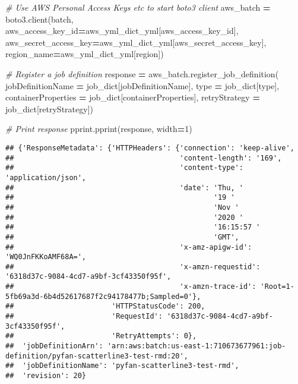 \documentclass[
]{book}
\newenvironment{Shaded}{\begin{snugshade}}{\end{snugshade}}
\newcommand{\BuiltInTok}[1]{#1}
\newcommand{\CommentTok}[1]{\textcolor[rgb]{0.56,0.35,0.01}{\textit{#1}}}
\newcommand{\DecValTok}[1]{\textcolor[rgb]{0.00,0.00,0.81}{#1}}
\newcommand{\NormalTok}[1]{#1}
\newcommand{\OperatorTok}[1]{\textcolor[rgb]{0.81,0.36,0.00}{\textbf{#1}}}
\newcommand{\StringTok}[1]{\textcolor[rgb]{0.31,0.60,0.02}{#1}}
\begin{document}
\begin{Shaded}
\begin{Highlighting}[]
\CommentTok{\# Use AWS Personal Access Keys etc to start boto3 client}
\NormalTok{aws\_batch }\OperatorTok{=}\NormalTok{ boto3.client(}\StringTok{\textquotesingle{}batch\textquotesingle{}}\NormalTok{,}
\NormalTok{  aws\_access\_key\_id}\OperatorTok{=}\NormalTok{aws\_yml\_dict\_yml[}\StringTok{\textquotesingle{}aws\_access\_key\_id\textquotesingle{}}\NormalTok{],}
\NormalTok{  aws\_secret\_access\_key}\OperatorTok{=}\NormalTok{aws\_yml\_dict\_yml[}\StringTok{\textquotesingle{}aws\_secret\_access\_key\textquotesingle{}}\NormalTok{],}
\NormalTok{  region\_name}\OperatorTok{=}\NormalTok{aws\_yml\_dict\_yml[}\StringTok{\textquotesingle{}region\textquotesingle{}}\NormalTok{])}

\CommentTok{\# Register a job definition}
\NormalTok{response }\OperatorTok{=}\NormalTok{ aws\_batch.register\_job\_definition(}
\NormalTok{        jobDefinitionName }\OperatorTok{=}\NormalTok{ job\_dict[}\StringTok{\textquotesingle{}jobDefinitionName\textquotesingle{}}\NormalTok{],}
        \BuiltInTok{type} \OperatorTok{=}\NormalTok{ job\_dict[}\StringTok{\textquotesingle{}type\textquotesingle{}}\NormalTok{],}
\NormalTok{        containerProperties }\OperatorTok{=}\NormalTok{ job\_dict[}\StringTok{\textquotesingle{}containerProperties\textquotesingle{}}\NormalTok{],}
\NormalTok{        retryStrategy }\OperatorTok{=}\NormalTok{ job\_dict[}\StringTok{\textquotesingle{}retryStrategy\textquotesingle{}}\NormalTok{])}

\CommentTok{\# Print response}
\NormalTok{pprint.pprint(response, width}\OperatorTok{=}\DecValTok{1}\NormalTok{)}
\end{Highlighting}
\end{Shaded}

\begin{verbatim}
## {'ResponseMetadata': {'HTTPHeaders': {'connection': 'keep-alive',
##                                       'content-length': '169',
##                                       'content-type': 'application/json',
##                                       'date': 'Thu, '
##                                               '19 '
##                                               'Nov '
##                                               '2020 '
##                                               '16:15:57 '
##                                               'GMT',
##                                       'x-amz-apigw-id': 'WQ0JnFKKoAMF68A=',
##                                       'x-amzn-requestid': '6318d37c-9084-4cd7-a9bf-3cf43350f95f',
##                                       'x-amzn-trace-id': 'Root=1-5fb69a3d-6b4d52617687f2c94178477b;Sampled=0'},
##                       'HTTPStatusCode': 200,
##                       'RequestId': '6318d37c-9084-4cd7-a9bf-3cf43350f95f',
##                       'RetryAttempts': 0},
##  'jobDefinitionArn': 'arn:aws:batch:us-east-1:710673677961:job-definition/pyfan-scatterline3-test-rmd:20',
##  'jobDefinitionName': 'pyfan-scatterline3-test-rmd',
##  'revision': 20}
\end{verbatim}
\end{document}
